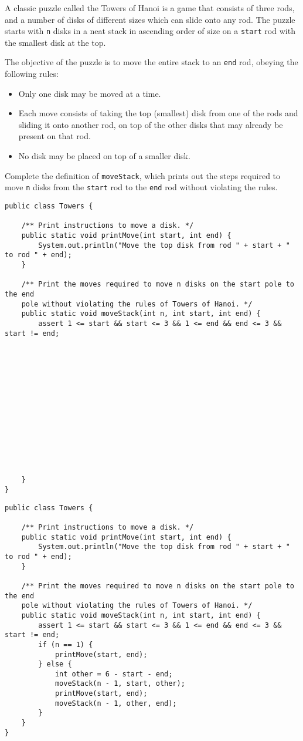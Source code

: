 \question A classic puzzle called the Towers of Hanoi is a game that consists of three rods, and a number of disks of different sizes which can slide onto any rod. The puzzle starts with \texttt{n} disks in a neat stack in ascending order of size on a \texttt{start} rod with the smallest disk at the top.

The objective of the puzzle is to move the entire stack to an \texttt{end} rod, obeying the following rules:
\begin{itemize}
\item Only one disk may be moved at a time.
\item Each move consists of taking the top (smallest) disk from one of the rods and sliding it onto another rod, on top of the other disks that may already be present on that rod.
\item No disk may be placed on top of a smaller disk.
\end{itemize}

Complete the definition of \texttt{moveStack}, which prints out the steps required to move \texttt{n} disks from the \texttt{start} rod to the \texttt{end} rod without violating the rules.

\ifprintanswers\else
\begin{lstlisting}
public class Towers {

    /** Print instructions to move a disk. */
    public static void printMove(int start, int end) {
        System.out.println("Move the top disk from rod " + start + " to rod " + end);
    }

    /** Print the moves required to move n disks on the start pole to the end
    pole without violating the rules of Towers of Hanoi. */
    public static void moveStack(int n, int start, int end) {
        assert 1 <= start && start <= 3 && 1 <= end && end <= 3 && start != end;














    }
}
\end{lstlisting}
\fi

\begin{solution}
\begin{lstlisting}
public class Towers {

    /** Print instructions to move a disk. */
    public static void printMove(int start, int end) {
        System.out.println("Move the top disk from rod " + start + " to rod " + end);
    }

    /** Print the moves required to move n disks on the start pole to the end
    pole without violating the rules of Towers of Hanoi. */
    public static void moveStack(int n, int start, int end) {
        assert 1 <= start && start <= 3 && 1 <= end && end <= 3 && start != end;
        if (n == 1) {
            printMove(start, end);
        } else {
            int other = 6 - start - end;
            moveStack(n - 1, start, other);
            printMove(start, end);
            moveStack(n - 1, other, end);
        }
    }
}
\end{lstlisting}
\end{solution}